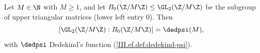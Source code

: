 Let $M\in\N$ with $M\ge1$, and let $B_0(\Z/M\Z)\le\GL_2(\Z/M\Z)$ be the subgroup of upper triangular matrices (lower left entry $0$).
Then
\[
  [\GL_2(\Z/M\Z):B_0(\Z/M\Z)]=\dedpsi(M),
\]
with $\dedpsi$ Dedekind's function (\cref{III.ef.def:dedekind-psi}).
